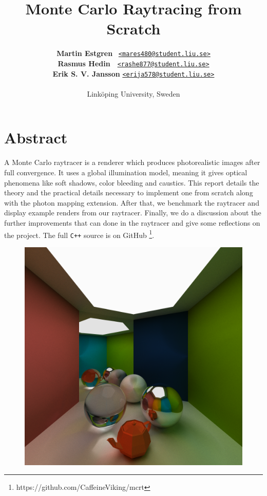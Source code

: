\documentclass[a4paper, twocolumn]{article}
\title{\LARGE{\textbf{Monte Carlo Raytracing from Scratch}}}
\author{{\textbf{Martin Estgren}} \;\;\;\;\;\;\;\;\;\;\;\;\;\,   {\href{mailto:mares480@student.liu.se}
                                                                 {\texttt{<mares480@student.liu.se>}}} \\
        {\textbf{Rasmus Hedin}} \;\;\;\;\;\;\;\;\;\;\;\;\;\;\,\, {\href{mailto:rashe877@student.liu.se}
                                                                 {\texttt{<rashe877@student.liu.se>}}} \\
        {\textbf{Erik S. V. Jansson}} \;\;\;\;\;\;\;\;           {\href{mailto:erija578@student.liu.se}
                                                                 {\texttt{<erija578@student.liu.se>}}} \\~\\
        {Linköping University, Sweden}\vspace{-1.0ex}}
\begin{document}
    \maketitle
    \section*{Abstract}

    A Monte Carlo raytracer is a renderer which produces photorealistic images after full convergence. It uses a global illumination model, meaning it gives optical phenomena like soft shadows, color bleeding and caustics. This report details the theory and the practical details necessary to implement one from scratch along with the photon mapping extension. After that, we benchmark the raytracer and display example renders from our raytracer. Finally, we do a discussion about the further improvements that can done in the raytracer and give some reflections on the project. The full \texttt{C++} source is on GitHub \footnote{https://github.com/CaffeineViking/mcrt}.

    \begin{figure}[ht]
        \centering
        \includegraphics[width=\linewidth]{share/new_render.png}
    \end{figure}

    \newpage \tableofcontents \clearpage
\end{document}
